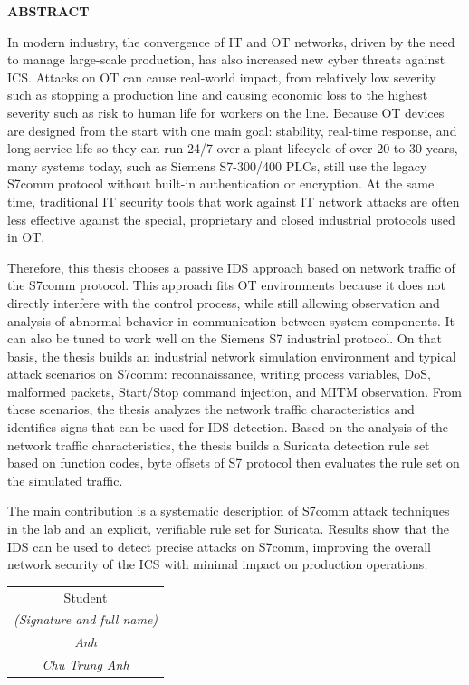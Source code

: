 \documentclass[../main.tex]{subfiles}
\begin{document}
\begin{center}
    \Large{\textbf{ABSTRACT}}\\
\end{center}
\vspace{1cm}

In modern industry, the convergence of IT and OT networks, driven by the need to manage large-scale production, has also increased new cyber threats against ICS. Attacks on OT can cause real-world impact, from relatively low severity such as stopping a production line and causing economic loss to the highest severity such as risk to human life for workers on the line. Because OT devices are designed from the start with one main goal: stability, real-time response, and long service life so they can run 24/7 over a plant lifecycle of over 20 to 30 years, many systems today, such as Siemens S7-300/400 PLCs, still use the legacy S7comm protocol without built-in authentication or encryption. At the same time, traditional IT security tools that work against IT network attacks are often less effective against the special, proprietary and closed industrial protocols used in OT.

Therefore, this thesis chooses a passive IDS approach based on network traffic of the S7comm protocol. This approach fits OT environments because it does not directly interfere with the control process, while still allowing observation and analysis of abnormal behavior in communication between system components. It can also be tuned to work well on the Siemens S7 industrial protocol. On that basis, the thesis builds an industrial network simulation environment and typical attack scenarios on S7comm: reconnaissance, writing process variables, DoS, malformed packets, Start/Stop command injection, and MITM observation. From these scenarios, the thesis analyzes the network traffic characteristics and identifies signs that can be used for IDS detection. Based on the analysis of the network traffic characteristics, the thesis builds a Suricata detection rule set based on function codes, byte offsets of S7 protocol then evaluates the rule set on the simulated traffic.

The main contribution is a systematic description of S7comm attack techniques in the lab and an explicit, verifiable rule set for Suricata. Results show that the IDS can be used to detect precise attacks on S7comm, improving the overall network security of the ICS with minimal impact on production operations.


\begin{flushright}
\begin{tabular}{@{}c@{}}
Student\\
\textit{(Signature and full name)} \\
\vspace{1cm}
\textit{Anh} \\
\vspace{1cm}
\textit{Chu Trung Anh} \\
\end{tabular}
\end{flushright}
\end{document}
